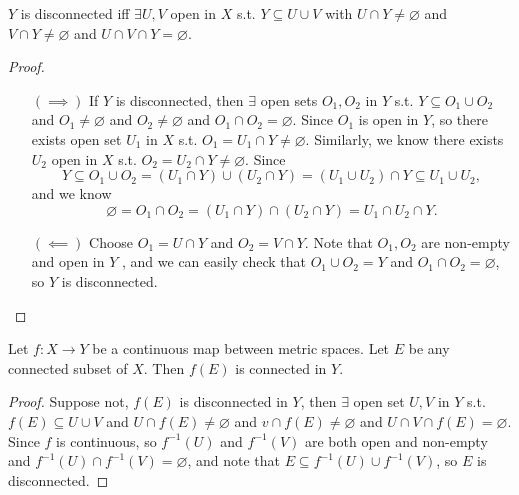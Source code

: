 \begin{remark}
    \(Y\) is disconnected iff \(\exists U, V\) open in \(X\) s.t. \(Y \subseteq U \cup V\) with \(U \cap Y \neq \varnothing \) and \(V \cap Y \neq \varnothing \) and \(U \cap V \cap Y = \varnothing \).        
\end{remark}
\begin{proof}
    \vphantom{text} 
    \begin{itemize}
        \item [\((\implies )\)] If \(Y\) is disconnected, then \(\exists \) open sets \(O_1, O_2\) in \(Y\) s.t. \(Y \subseteq O_1 \cup O_2\) and \(O_1 \neq \varnothing \) and \(O_2 \neq \varnothing \) and \(O_1 \cap O_2 = \varnothing \). Since \(O_1\) is open in \(Y\), so there exists open set \(U_1\) in \(X\) s.t. \(O_1 = U_1 \cap Y \neq \varnothing \). Similarly, we know there exists \(U_2\) open in \(X\) s.t. \(O_2 = U_2 \cap Y \neq \varnothing \). Since 
        \[
            Y \subseteq O_1 \cup O_2 = (U_1 \cap Y) \cup (U_2 \cap Y) = (U_1 \cup U_2) \cap Y \subseteq U_1 \cup U_2,
        \] and we know
        \[
            \varnothing = O_1 \cap O_2 = (U_1 \cap Y) \cap (U_2 \cap Y) = U_1 \cap U_2 \cap Y.
        \]
        \item [\((\impliedby )\)] Choose \(O_1 = U \cap Y\) and \(O_2 = V \cap Y\). Note that \(O_1, O_2 \) are non-empty and open in \(Y\) , and we can easily check that \(O_1 \cup O_2 = Y\) and \(O_1 \cap O_2 = \varnothing \), so \(Y\) is disconnected.       
    \end{itemize}
\end{proof}

\begin{theorem}
    Let \(f : X \to Y\) be a continuous map between metric spaces. Let \(E\) be any connected subset of \(X\). Then \(f(E)\) is connected in \(Y\).     
\end{theorem}
\begin{proof}
    Suppose not, \(f(E)\) is disconnected in \(Y\), then \(\exists \) open set \(U, V\) in \(Y\) s.t. \(f(E) \subseteq U \cup V\) and \(U \cap f(E) \neq \varnothing \) and \(v \cap f(E) \neq \varnothing \) and \(U \cap V \cap f(E) = \varnothing \). Since \(f\) is continuous, so \(f^{-1}(U)\) and \(f^{-1}(V)\) are both open and non-empty and \(f^{-1}(U) \cap f^{-1}(V) = \varnothing \), and note that \(E \subseteq f^{-1}(U) \cup f^{-1}(V)\), so \(E\) is disconnected.              
\end{proof}


